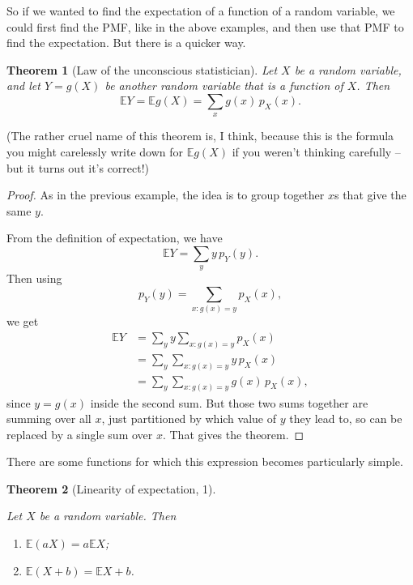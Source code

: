 \documentclass[
  a4paper,
]{book}
\providecommand{\tightlist}{%
  \setlength{\itemsep}{0pt}\setlength{\parskip}{0pt}}
\newtheorem{theorem}{Theorem}[chapter]
\theoremstyle{definition}
\theoremstyle{definition}
\theoremstyle{definition}
\theoremstyle{definition}
\theoremstyle{remark}
\begin{document}
So if we wanted to find the expectation of a function of a random variable, we could first find the PMF, like in the above examples, and then use that PMF to find the expectation. But there is a quicker way.

\begin{theorem}[Law of the unconscious statistician]
\protect\hypertarget{thm:unconscious}{}\label{thm:unconscious}Let \(X\) be a random variable, and let \(Y = g(X)\) be another random variable that is a function of \(X\). Then
\[  \mathbb EY = \mathbb Eg(X) = \sum_{x} g(x) \, p_X(x) . \]
\end{theorem}

(The rather cruel name of this theorem is, I think, because this is the formula you might carelessly write down for \(\mathbb Eg(X)\) if you weren't thinking carefully -- but it turns out it's correct!)

\begin{proof}
As in the previous example, the idea is to group together \(x\)s that give the same \(y\).

From the definition of expectation, we have
\[ \mathbb EY = \sum_y y\, p_Y(y) . \]
Then using
\[ p_Y(y) = \sum_{x : g(x) = y} p_X(x) , \]
we get
\begin{align*}
  \mathbb EY &= \sum_y y \sum_{x : g(x) = y} p_X(x) \\
    &= \sum_y \sum_{x : g(x) = y} y\,p_X(x) \\
    &= \sum_y \sum_{x : g(x) = y} g(x) \, p_X(x) ,
\end{align*}
since \(y = g(x)\) inside the second sum. But those two sums together are summing over all \(x\), just partitioned by which value of \(y\) they lead to, so can be replaced by a single sum over \(x\). That gives the theorem.
\end{proof}

There are some functions for which this expression becomes particularly simple.

\begin{theorem}[Linearity of expectation, 1]
\protect\hypertarget{thm:linearity1}{}\label{thm:linearity1}

Let \(X\) be a random variable. Then

\begin{enumerate}
\def\labelenumi{\arabic{enumi}.}
\tightlist
\item
  \(\mathbb E(aX) = a\mathbb EX\);
\item
  \(\mathbb E(X + b) = \mathbb EX + b\).
\end{enumerate}

\end{theorem}
\end{document}
